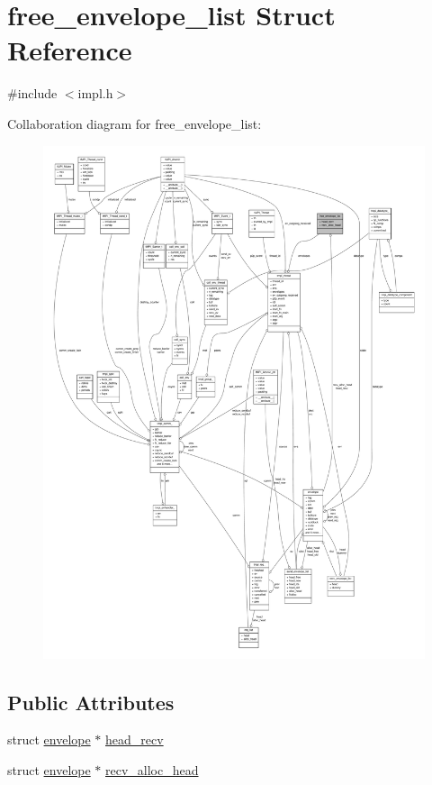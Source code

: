 \hypertarget{structfree__envelope__list}{\section{free\-\_\-envelope\-\_\-list \-Struct \-Reference}
\label{structfree__envelope__list}
}


{\ttfamily \#include $<$impl.\-h$>$}



\-Collaboration diagram for free\-\_\-envelope\-\_\-list\-:
\nopagebreak
\begin{figure}[H]
\begin{center}
\leavevmode
\includegraphics[width=350pt]{structfree__envelope__list__coll__graph}
\end{center}
\end{figure}
\subsection*{\-Public \-Attributes}
\begin{DoxyCompactItemize}
\item 
struct \hyperlink{structenvelope}{envelope} $\ast$ \hyperlink{structfree__envelope__list_a39e728209784c57a78e59a530b968db4}{head\-\_\-recv}
\item 
struct \hyperlink{structenvelope}{envelope} $\ast$ \hyperlink{structfree__envelope__list_a73877606aab25da40236de6fd8fba6a2}{recv\-\_\-alloc\-\_\-head}
\end{DoxyCompactItemize}


